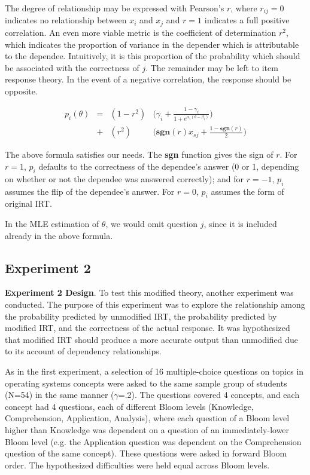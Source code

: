 The degree of relationship may be expressed with Pearson's $r$, where
$r_{ij}=0$ indicates no relationship between $x_i$ and $x_j$ and $r=1$
indicates a full positive correlation.  An even more viable metric is the
coefficient of determination $r^2$, which indicates the proportion of variance
in the depender which is attributable to the dependee.  Intuitively, it is this
proportion of the probability which should be associated with the correctness
of $j$.  The remainder may be left to item response theory.  In the event of a
negative correlation, the response should be opposite.


\begin{align*}
  p_i(\theta) &=& (1-r^2) & \Big(\gamma_i + \frac{1-\gamma_i}{1+e^{\alpha_i(\theta-\beta_i)}}\Big) \\
              &+& (r^2)   & \Big(\mathbf{sgn}(r)x_{sj}+\frac{1-\mathbf{sgn}(r)}{2}\Big)
\end{align*}

The above formula satisfies our needs.  The \textbf{sgn} function gives the
sign of $r$.  For $r=1$, $p_i$ defaults to the correctness of the dependee's
answer (0 or 1, depending on whether or not the dependee was answered
correctly);  and for $r=-1$, $p_i$ assumes the flip of the dependee's answer.
For $r=0$, $p_i$ assumes the form of original IRT.  

In the MLE estimation of $\theta$, we would omit question $j$, since it is
included already in the above formula.

\subsection{Experiment 2}

\textbf{Experiment 2 Design}.  To test this modified theory, another experiment
was conducted.  The purpose of this experiment was to explore the relationship
among the probability predicted by unmodified IRT, the probability predicted by
modified IRT, and the correctness of the actual response.  It was hypothesized
that modified IRT should produce a more accurate output than unmodified due to
its account of dependency relationships.

As in the first experiment, a selection of 16 multiple-choice questions on
topics in operating systems concepts were asked to the same sample group of
students (N=54) in the same manner ($\gamma$=.2).  The questions covered 4
concepts, and each concept had 4 questions, each of different Bloom levels
(Knowledge, Comprehension, Application, Analysis), where each question of a
Bloom level higher than Knowledge was dependent on a question of an
immediately-lower Bloom level (e.g. the Application question was dependent on
the Comprehension question of the same concept).  These questions were asked in
forward Bloom order.  The hypothesized difficulties were held equal across
Bloom levels.


